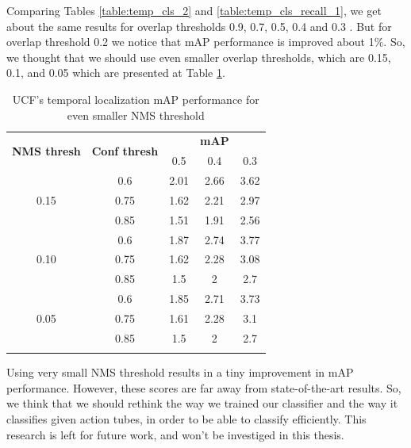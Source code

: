 \documentclass{report}
\begin{document}
Comparing Tables \ref{table:temp_cls_2} and \ref{table:temp_cls_recall_1}, we get about the same results for overlap thresholds 0.9, 0.7, 0.5, 0.4 and
0.3 . But for overlap threshold 0.2 we notice that mAP performance is improved about 1\%. So, we thought that we should use even smaller overlap thresholds,
which are 0.15, 0.1, and 0.05 which are presented at Table \ref{table:temp_cls_2_1}.

\begin{center}
  \begin{longtable}{|| c | c | c c c||}
    \hline
    \multirow{2}{*}{\textbf{NMS thresh}} & \multirow{2}{*}{\textbf{Conf thresh}} & {} & \textbf{mAP} & {} \\
    {} & {} & 0.5 & 0.4 & 0.3 \\
    \hline
    \multirow{3}{*}{0.15} & 0.6 & 2.01 & 2.66 & 3.62 \\
    \cline{2-5}
    {} & 0.75 & 1.62 & 2.21 & 2.97 \\
    \cline{2-5}
    {} & 0.85 & 1.51 & 1.91 & 2.56 \\
    \hline
    \multirow{3}{*}{0.10} & 0.6 & 1.87 & 2.74 & 3.77 \\
    \cline{2-5}
    {} & 0.75 & 1.62 & 2.28 & 3.08  \\
    \cline{2-5}
    {} & 0.85 & 1.5 & 2 & 2.7  \\
    \hline
    \multirow{3}{*}{0.05} & 0.6 & 1.85 & 2.71 & 3.73  \\
    \cline{2-5}
    {} & 0.75 & 1.61 & 2.28 & 3.1  \\
    \cline{2-5}
    {} & 0.85 & 1.5 & 2 & 2.7 \\
    \hline

    \caption{UCF's temporal localization mAP performance for even smaller NMS threshold}
    \label{table:temp_cls_2_1}

  \end{longtable}
\end{center}

Using very small NMS threshold results in a tiny improvement in mAP performance. However, these scores are far away from state-of-the-art results. So, we think that
we should rethink the way we trained our classifier and the way it classifies given action tubes, in order to be able to classify efficiently. This research is
left for future work, and won't be investiged in this thesis.
\end{document}
